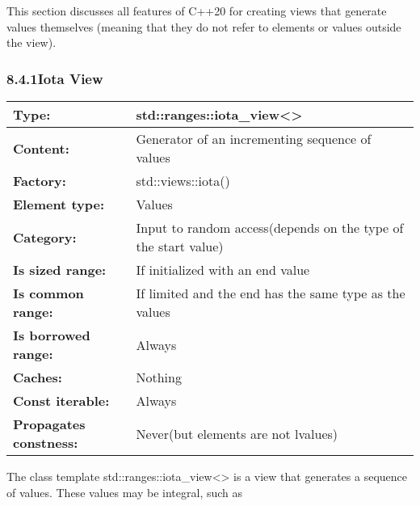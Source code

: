 
This section discusses all features of C++20 for creating views that generate values themselves (meaning that they do not refer to elements or values outside the view).

\subsubsection*{ 8.4.1\hspace{0.2cm}Iota View}

\begin{longtable}[c]{|l|l|}
\hline
\textbf{Type:}                 & std::ranges::iota\_view\textless{}\textgreater{} \\ \hline
\endfirsthead
%
\endhead
%
\textbf{Content:}              & Generator of an incrementing sequence of values  \\ \hline
\textbf{Factory:}              & std::views::iota()                               \\ \hline
\textbf{Element type:}         & Values                                           \\ \hline
\textbf{Category:}        & Input to random access(depends on the type of the start value) \\ \hline
\textbf{Is sized range:}       & If initialized with an end value                 \\ \hline
\textbf{Is common range:} & If limited and the end has the same type as the values         \\ \hline
\textbf{Is borrowed range:}    & Always                                           \\ \hline
\textbf{Caches:}               & Nothing                                          \\ \hline
\textbf{Const iterable:}       & Always                                           \\ \hline
\textbf{Propagates constness:} & Never(but elements are not lvalues)              \\ \hline
\end{longtable}

The class template std::ranges::iota\_view<> is a view that generates a sequence of values. These values may be integral, such as

